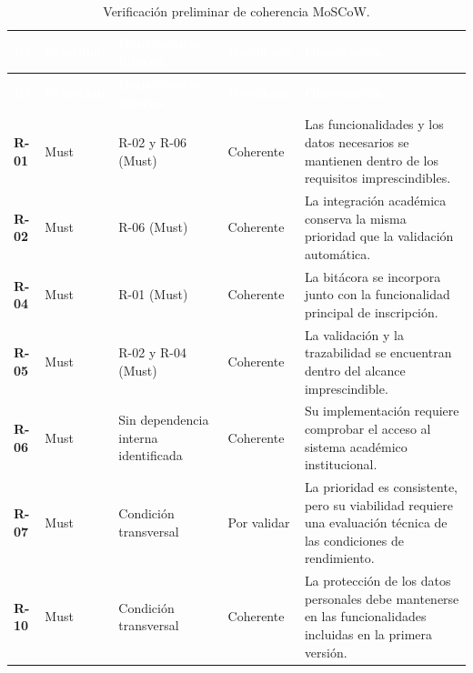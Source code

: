 \documentclass[12pt,a4paper]{article}
\newcommand{\cabecera}[1]{
    \textcolor{white}{\textbf{#1}}
}
\begin{document}
\begin{longtable}{
    C{1.2cm}
    C{2.0cm}
    L{3.5cm}
    L{2.0cm}
    L{5.5cm}
}

\caption{Verificación preliminar de coherencia MoSCoW.}
\label{tab:coherencia-moscow}\\

\cabecera{ID} &
\cabecera{Prioridad} &
\cabecera{Dependencia interna} &
\cabecera{Resultado} &
\cabecera{Observación} \\

\endfirsthead

\cabecera{ID} &
\cabecera{Prioridad} &
\cabecera{Dependencia interna} &
\cabecera{Resultado} &
\cabecera{Observación} \\

\endhead

\bottomrule

\endfoot

\textbf{R-01} &
Must &
R-02 y R-06 (Must) &
Coherente &
Las funcionalidades y los datos necesarios
se mantienen dentro de los requisitos
imprescindibles. \\

\textbf{R-02} &
Must &
R-06 (Must) &
Coherente &
La integración académica conserva la misma
prioridad que la validación automática. \\

\textbf{R-04} &
Must &
R-01 (Must) &
Coherente &
La bitácora se incorpora junto con la
funcionalidad principal de inscripción. \\

\textbf{R-05} &
Must &
R-02 y R-04 (Must) &
Coherente &
La validación y la trazabilidad se encuentran
dentro del alcance imprescindible. \\

\textbf{R-06} &
Must &
Sin dependencia interna identificada &
Coherente &
Su implementación requiere comprobar el
acceso al sistema académico institucional. \\

\textbf{R-07} &
Must &
Condición transversal &
Por validar &
La prioridad es consistente, pero su
viabilidad requiere una evaluación técnica
de las condiciones de rendimiento. \\

\textbf{R-10} &
Must &
Condición transversal &
Coherente &
La protección de los datos personales
debe mantenerse en las funcionalidades
incluidas en la primera versión. \\

\end{longtable}
\end{document}
